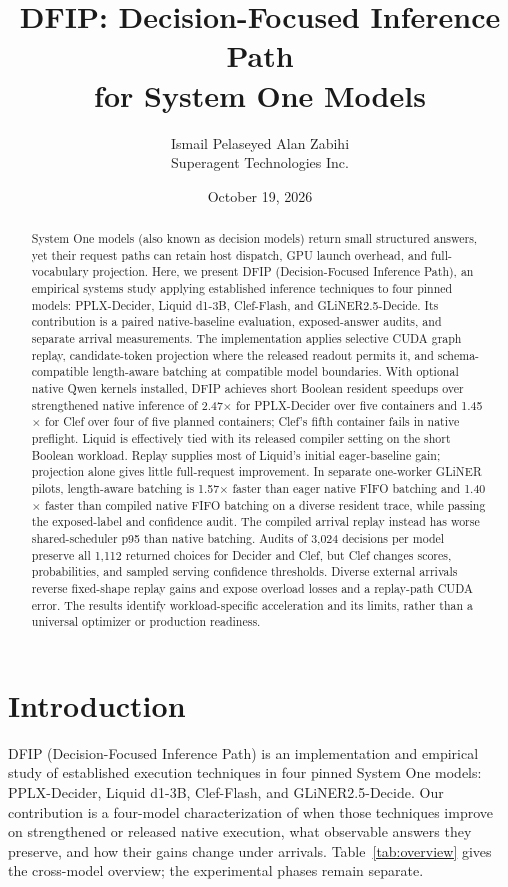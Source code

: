 \documentclass[10pt,twocolumn]{article}
\title{DFIP: Decision-Focused Inference Path\protect\\for System One Models}
\author{Ismail Pelaseyed \qquad Alan Zabihi\\Superagent Technologies Inc.}
\date{October 19, 2026}
\begin{document}
\maketitle
\begin{abstract}
System One models (also known as decision models) return small structured answers, yet their request paths can retain host dispatch, GPU launch overhead, and full-vocabulary projection. Here, we present DFIP (Decision-Focused Inference Path), an empirical systems study applying established inference techniques to four pinned models: PPLX-Decider, Liquid d1-3B, Clef-Flash, and GLiNER2.5-Decide. Its contribution is a paired native-baseline evaluation, exposed-answer audits, and separate arrival measurements. The implementation applies selective CUDA graph replay, candidate-token projection where the released readout permits it, and schema-compatible length-aware batching at compatible model boundaries. With optional native Qwen kernels installed, DFIP achieves short Boolean resident speedups over strengthened native inference of 2.47$\times$ for PPLX-Decider over five containers and 1.45$\times$ for Clef over four of five planned containers; Clef's fifth container fails in native preflight. Liquid is effectively tied with its released compiler setting on the short Boolean workload. Replay supplies most of Liquid's initial eager-baseline gain; projection alone gives little full-request improvement. In separate one-worker GLiNER pilots, length-aware batching is 1.57$\times$ faster than eager native FIFO batching and 1.40$\times$ faster than compiled native FIFO batching on a diverse resident trace, while passing the exposed-label and confidence audit. The compiled arrival replay instead has worse shared-scheduler p95 than native batching. Audits of 3,024 decisions per model preserve all 1,112 returned choices for Decider and Clef, but Clef changes scores, probabilities, and sampled serving confidence thresholds. Diverse external arrivals reverse fixed-shape replay gains and expose overload losses and a replay-path CUDA error. The results identify workload-specific acceleration and its limits, rather than a universal optimizer or production readiness.
\end{abstract}

\section{Introduction}
DFIP (Decision-Focused Inference Path) is an implementation and empirical study of established execution techniques in four pinned System One models: PPLX-Decider, Liquid d1-3B, Clef-Flash, and GLiNER2.5-Decide. Our contribution is a four-model characterization of when those techniques improve on strengthened or released native execution, what observable answers they preserve, and how their gains change under arrivals. Table~\ref{tab:overview} gives the cross-model overview; the experimental phases remain separate.
\end{document}
